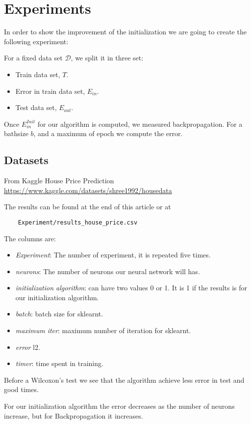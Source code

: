 \section*{Experiments}

In order to show the improvement of 
the initialization we are going to create the following 
experiment: 

For a fixed data set $\mathcal{D}$, we split it in 
three set: 

\begin{itemize}
    \item Train data set, $T$. 
    \item Error in train data set, $E_{in}$. 
    \item Test data set, $E_{out}$. 
\end{itemize}

Once $E_{in}^{Init}$ for our algorithm is computed,
we measured backpropagation.
For a bathsize $b$, and a maximum of epoch we compute the error.  

\subsection*{Datasets}

From Kaggle House Price Prediction 
\url{https://www.kaggle.com/datasets/shree1992/housedata}

The results can be found at the end of this article or
at 
 \begin{verbatim}
    Experiment/results_house_price.csv
\end{verbatim}

The columns are: 
\begin{itemize}
    \item \textit{Experiment}: The number of experiment, it is repeated five times. 
    \item \textit{neurons}: The number of neurons our neural network will has. 
    \item \textit{initialization algorithm}: can have two values 0 or 1. It is 1 if the results is for our initialization algorithm. 
    \item \textit{batch}: batch size for sklearnt.
    \item \textit{maximum iter}: maximum number of iteration for sklearnt. 
    \item \textit{error} l2.
    \item \textit{timer}: time spent in training. 
\end{itemize}

Before a Wilcoxon's test we see that the algorithm 
achieve less error in test and good times. 
 
For our initialization algorithm the error decreases
 as the number of neurons increase,
but for Backpropagation it increases.

